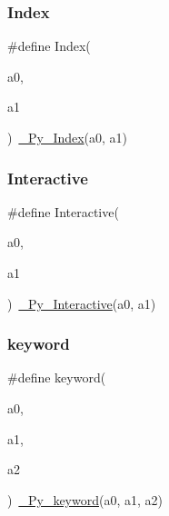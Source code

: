 \mbox{\label{_python-ast_8h_a2a3071e7f860820007763b32d1b8ef9c}} 
\subsubsection{\texorpdfstring{Index}{Index}}
{\footnotesize\ttfamily \#define Index(\begin{DoxyParamCaption}\item[{}]{a0,  }\item[{}]{a1 }\end{DoxyParamCaption})~\mbox{\hyperlink{_python-ast_8h_a9aac09e16c4da5fdfa59d726fa0e1e2c}{\+\_\+\+Py\+\_\+\+Index}}(a0, a1)}

\mbox{\label{_python-ast_8h_a548fae4933b00e338520d721a85e4160}} 
\subsubsection{\texorpdfstring{Interactive}{Interactive}}
{\footnotesize\ttfamily \#define Interactive(\begin{DoxyParamCaption}\item[{}]{a0,  }\item[{}]{a1 }\end{DoxyParamCaption})~\mbox{\hyperlink{_python-ast_8h_a8e15d080424e133f37dcc31ddd99a34b}{\+\_\+\+Py\+\_\+\+Interactive}}(a0, a1)}

\mbox{\label{_python-ast_8h_a6f4e4451f80663655311eff20aad3ed5}} 
\subsubsection{\texorpdfstring{keyword}{keyword}}
{\footnotesize\ttfamily \#define keyword(\begin{DoxyParamCaption}\item[{}]{a0,  }\item[{}]{a1,  }\item[{}]{a2 }\end{DoxyParamCaption})~\mbox{\hyperlink{_python-ast_8h_aa25dc5cb8a1078deaea4ea52c7db9113}{\+\_\+\+Py\+\_\+keyword}}(a0, a1, a2)}


